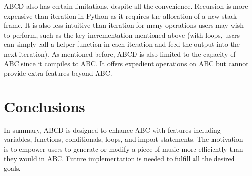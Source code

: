 ABCD also has certain limitations, despite all the convenience. Recursion is more expensive than iteration in Python as it requires the allocation of a new stack frame.  It is also less intuitive than iteration for many operations users may wish to perform, such as the key incrementation mentioned above (with loops, users can simply call a helper function in each iteration and feed the output into the next iteration). As mentioned before, ABCD is also limited to the capacity of ABC since it compiles to ABC. It offers expedient operations on ABC but cannot provide extra features beyond ABC.

\section{Conclusions}
In summary, ABCD is designed to enhance ABC with features including variables, functions, conditionals, loops, and import statements. The motivation is to empower users to generate or modify a piece of music more efficiently than they would in ABC.  Future implementation is needed to fulfill all the desired goals.
